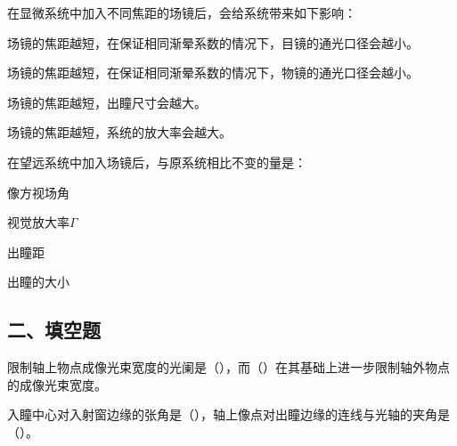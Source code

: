 \documentclass[padl, analysis, notocnum]{ExBook}
\newcommand{\answerarea}[1][3.5cm]{%
  \par\vspace{1mm}%
  \noindent{\color{themeColor!35}\rule{\linewidth}{0.4pt}}\par
  \noindent\begin{minipage}[t][#1][t]{\linewidth}\vspace{0pt}\end{minipage}\par
  \noindent{\color{themeColor!35}\rule{\linewidth}{0.4pt}}\par
}
\begin{document}
\begin{qitems}[startnum=7]
\qitem 在显微系统中加入不同焦距的场镜后，会给系统带来如下影响：
\par\noindent\hspace{2em}场镜的焦距越短，在保证相同渐晕系数的情况下，目镜的通光口径会越小。
\par\noindent\hspace{2em}场镜的焦距越短，在保证相同渐晕系数的情况下，物镜的通光口径会越小。
\par\noindent\hspace{2em}场镜的焦距越短，出瞳尺寸会越大。
\par\noindent\hspace{2em}场镜的焦距越短，系统的放大率会越大。
\label{q:76:start}
\answerarea[4.0cm]
\label{q:76:end}
\end{qitems}

\begin{qitems}[startnum=8]
\qitem 在望远系统中加入场镜后，与原系统相比不变的量是：
\par\noindent\hspace{2em}像方视场角
\par\noindent\hspace{2em}视觉放大率$\Gamma$
\par\noindent\hspace{2em}出瞳距
\par\noindent\hspace{2em}出瞳的大小
\label{q:77:start}
\answerarea[4.0cm]
\label{q:77:end}
\end{qitems}

\subsection{二、填空题}
\begin{qitems}[startnum=1]
\qitem 限制轴上物点成像光束宽度的光阑是（\hspace{1.6em}），而（\hspace{1.6em}）在其基础上进一步限制轴外物点的成像光束宽度。
\label{q:78:start}
\answerarea[4.0cm]
\label{q:78:end}
\end{qitems}

\begin{qitems}[startnum=2]
\qitem 入瞳中心对入射窗边缘的张角是（\hspace{1.6em}），轴上像点对出瞳边缘的连线与光轴的夹角是（\hspace{1.6em}）。
\label{q:79:start}
\answerarea[4.0cm]
\label{q:79:end}
\end{qitems}
\end{document}
